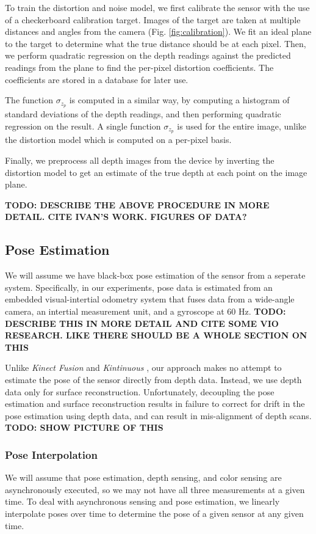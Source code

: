 \documentclass[conference,10pt]{IEEEtran}
\begin{document}
 To train the distortion and noise model, we first calibrate the sensor with the
 use of a checkerboard calibration target. Images of the target are taken at
 multiple distances and angles from the camera (Fig. \ref{fig:calibration}). We
 fit an ideal plane to the target to determine what the true distance should be
 at each pixel. Then, we perform quadratic regression on the depth readings
 against the predicted readings from the plane to find the per-pixel distortion
 coefficients. The coefficients are stored in a database for later use.

The function $\sigma_{z_p}$ is computed in a similar way, by computing a
histogram of standard deviations of the depth readings, and then performing
quadratic regression on the result. A single function $\sigma_{z_p}$ is used for
the entire image, unlike the distortion model which is computed on a per-pixel
basis.

Finally, we preprocess all depth images from the device by inverting the
distortion model to get an estimate of the true depth at each point on the
image plane.

\textbf{TODO: DESCRIBE THE ABOVE PROCEDURE IN MORE DETAIL. CITE IVAN'S WORK.
FIGURES OF DATA? }

\subsection{Pose Estimation}
We will assume we have black-box pose estimation of the sensor from a seperate
system. Specifically, in our experiments, pose data is estimated from an
embedded visual-intertial odometry system that fuses data from a wide-angle camera, an
intertial measurement unit, and a gyroscope at 60 Hz. \textbf{TODO: DESCRIBE
THIS IN MORE DETAIL AND CITE SOME VIO RESEARCH. LIKE THERE SHOULD BE A WHOLE
SECTION ON THIS}

Unlike \textit{Kinect Fusion} \cite{Newcombe} and \textit{Kintinuous}
\cite{Whelan2013}, our approach makes no attempt to estimate the pose of the
sensor directly from depth data. Instead, we use depth data only for surface
reconstruction. Unfortunately, decoupling the pose estimation and surface
reconstruction results in failure to correct for drift in the pose estimation
using depth data, and can result in mis-alignment of depth scans. \textbf{TODO:
SHOW PICTURE OF THIS}

\subsubsection{Pose Interpolation}
We will assume that pose estimation, depth sensing, and color sensing are
asynchronously executed, so we may not have all three measurements at a given
time. To deal with asynchronous sensing and pose estimation, we linearly
interpolate poses over time to determine the pose of a given sensor at any given time.
\end{document}
